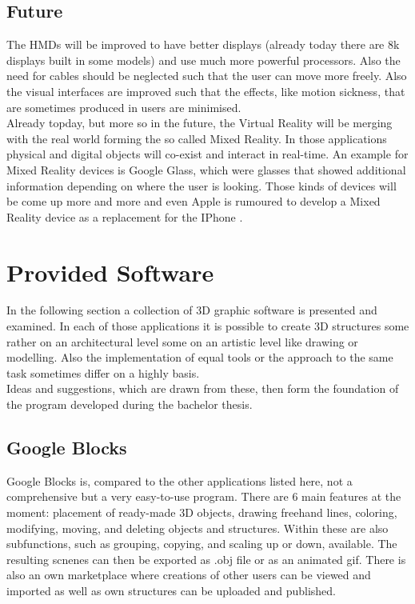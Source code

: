 \documentclass{report}
\begin{document}
		\subsection{Future}
		\startsubsection
			The HMDs will be improved to have better displays (already today there are 8k displays built in some models) and use much more powerful processors. Also the need for cables should be neglected such that the user can move more freely. Also the visual interfaces are improved such that the effects, like motion sickness, that are sometimes produced in users are minimised. \\
			Already topday, but more so in the future, the Virtual Reality will be merging with the real world forming the so called Mixed Reality. In those applications physical and digital objects will co-exist and interact in real-time. An example for Mixed Reality devices is Google Glass, which were glasses that showed additional information depending on where the user is looking. Those kinds of devices will be come up more and more and even Apple is rumoured to develop a Mixed Reality device as a replacement for the IPhone \cite{VRHistory}. \\
		\closesection
	\closesection
		
	
	\section{Provided Software} \label{Provided Software}
	\startsection
		In the following section a collection of 3D graphic software is presented and examined. In each of those applications it is possible to create 3D structures some rather on an architectural level some on an artistic level like drawing or modelling. Also the implementation of equal tools or the approach to the same task sometimes differ on a highly basis. \\
		Ideas and suggestions, which are drawn from these, then form the foundation of the program developed during the bachelor thesis.
		\subsection[Google Blocks]{Google Blocks \textsc{\small{\cite{GB4}}}}
		\startsubsection
			Google Blocks is, compared to the other applications listed here, not a comprehensive but a very easy-to-use program. There are 6 main features at the moment: placement of ready-made 3D objects, drawing freehand lines, coloring, modifying, moving, and deleting objects and structures. Within these are also subfunctions, such as grouping, copying, and scaling up or down, available. The resulting scnenes can then be exported as .obj file or as an animated gif. There is also an own marketplace where creations of other users can be viewed and imported as well as own structures can be uploaded and published.
		\closesection
\end{document}
